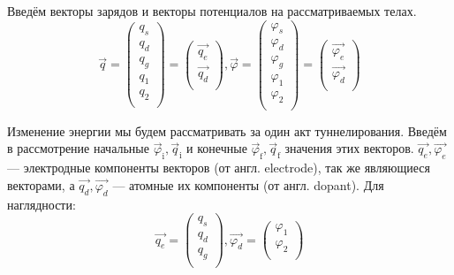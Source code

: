\documentclass[12pt,a4paper]{report}
\begin{document}
Введём векторы зарядов и векторы потенциалов на рассматриваемых телах.
\begin{equation}
\vec{q} =  \left(
  \begin{array}{c}
    q_s\\
    q_d\\
    q_g\\
    q_1\\
    q_2\\
  \end{array}
  \right) = \left(
  \begin{array}{c}
  \vec{q_e}\\
  \vec{q_d}\\
  \end{array}
  \right)
  , 
  \vec{\varphi} = \left(
  \begin{array}{c}
  \varphi_s\\
  \varphi_d\\
  \varphi_g\\
  \varphi_1\\
  \varphi_2\\
  \end{array}
  \right) = \left(
  \begin{array}{c}
  \vec{\varphi_e}\\
  \vec{\varphi_d}\\
  \end{array}
  \right)
\end{equation}

Изменение энергии мы будем рассматривать за один акт туннелирования. Введём в рассмотрение начальные $\vec{\varphi}_{\mbox{i}}, \vec{q}_{\mbox{i}}$ и конечные $\vec{\varphi}_{\mbox{f}}, \vec{q}_{\mbox{f}}$ значения этих векторов. $\vec{q_e}, \vec{\varphi_e}$ — электродные компоненты векторов (от англ. electrode), так же являющиеся векторами, а $\vec{q_d}, \vec{\varphi_d}$ — атомные их компоненты (от англ. dopant). Для наглядности:
\begin{equation}
\vec{q_e} = \left(
\begin{array}{c}
q_s\\
q_d\\
q_g\\
\end{array}
\right),
\vec{\varphi_d} = \left(
\begin{array}{c}
\varphi_1\\
\varphi_2\\
\end{array}
\right)
\end{equation}
\end{document}
